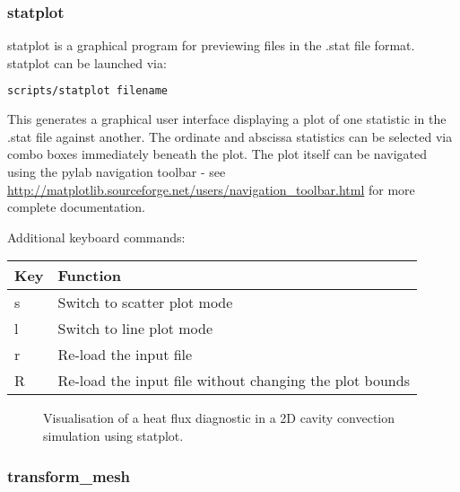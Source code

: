 
\subsubsection{statplot}
\label{sect:statplot}

statplot is a graphical program for previewing files in the .stat file format.
statplot can be launched via:

\begin{lstlisting}[language = Bash]
scripts/statplot filename
\end{lstlisting}

This generates a graphical user interface displaying a plot of one statistic in
the .stat file against another. The ordinate and abscissa statistics can be
selected via combo boxes immediately beneath the plot. The plot itself can
be navigated using the pylab navigation toolbar - see
\url{http://matplotlib.sourceforge.net/users/navigation_toolbar.html} for
more complete documentation.

Additional keyboard commands:

\begin{center}
  \begin{tabular}{| l | l |}
    \hline
    Key & Function \\
    \hline
    s   & Switch to scatter plot mode \\
    l   & Switch to line plot mode \\
    r   & Re-load the input file \\
    R   & Re-load the input file without changing the plot bounds \\
    \hline
  \end{tabular}
\end{center}

\begin{figure}[ht]
  \centering
  \caption{Visualisation of a heat flux diagnostic in a 2D cavity convection
           simulation using statplot.}
  \label{fig:statplot}
\end{figure}


\subsubsection{transform\_mesh}
\label{sect:transform_mesh}


